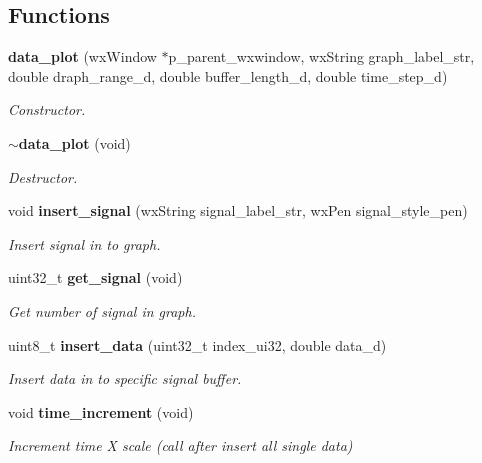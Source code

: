 \subsection*{Functions}
\begin{DoxyCompactItemize}
\item 
\textbf{ data\+\_\+plot} (wx\+Window $\ast$p\+\_\+parent\+\_\+wxwindow, wx\+String graph\+\_\+label\+\_\+str, double draph\+\_\+range\+\_\+d, double buffer\+\_\+length\+\_\+d, double time\+\_\+step\+\_\+d)
\begin{DoxyCompactList}\small\item\em Constructor. \end{DoxyCompactList}\item 
\textbf{ $\sim$data\+\_\+plot} (void)
\begin{DoxyCompactList}\small\item\em Destructor. \end{DoxyCompactList}\item 
void \textbf{ insert\+\_\+signal} (wx\+String signal\+\_\+label\+\_\+str, wx\+Pen signal\+\_\+style\+\_\+pen)
\begin{DoxyCompactList}\small\item\em Insert signal in to graph. \end{DoxyCompactList}\item 
uint32\+\_\+t \textbf{ get\+\_\+signal} (void)
\begin{DoxyCompactList}\small\item\em Get number of signal in graph. \end{DoxyCompactList}\item 
uint8\+\_\+t \textbf{ insert\+\_\+data} (uint32\+\_\+t index\+\_\+ui32, double data\+\_\+d)
\begin{DoxyCompactList}\small\item\em Insert data in to specific signal buffer. \end{DoxyCompactList}\item 
void \textbf{ time\+\_\+increment} (void)
\begin{DoxyCompactList}\small\item\em Increment time X scale (call after insert all single data) \end{DoxyCompactList}\end{DoxyCompactItemize}
